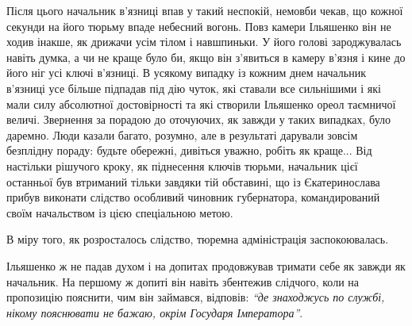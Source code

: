 \documentclass[a4paper,20pt]{report}
\begin{document}
Після цього начальник в'язниці впав у такий неспокій, немовби чекав, що кожної
секунди на його тюрьму впаде небесний вогонь. Повз камери Ільяшенко він не
ходив інакше, як дрижачи усім тілом і навшпиньки. У його голові зароджувалась
навіть думка, а чи не краще було би, якщо він з'явиться в камеру в'язня і кине
до його ніг усі ключі в'язниці.  В усякому випадку із кожним днем начальник
в'язниці усе більше підпадав під дію чуток, які ставали все сильнішими і які
мали силу абсолютної достовірності та які створили Ільяшенко ореол таємничої
величі. Звернення за порадою до оточуючих, як завжди у таких випадках, було
даремно.
Люди казали багато, розумно, але в результаті дарували зовсім безплідну пораду:
будьте обережні, дивіться уважно, робіть як краще... Від настільки рішучого кроку,
як піднесення ключів тюрьми, начальник цієї останньої був втриманий тільки завдяки тій обставині,
що із Єкатеринослава прибув виконати слідство особливий чиновник губернатора, командирований
своїм начальством із цією спеціальною метою.

В міру того, як розросталось слідство, тюремна адміністрація заспокоювалась.

Ільяшенко ж не падав духом і на допитах продовжував тримати себе як завжди як начальник.
На першому ж допиті він навіть збентежив слідчого, коли на пропозицію
пояснити, чим він займався, відповів:
\emph{``де знаходжусь по службі, нікому пояснювати не бажаю, окрім Государя Імператора''}. 
\end{document}
